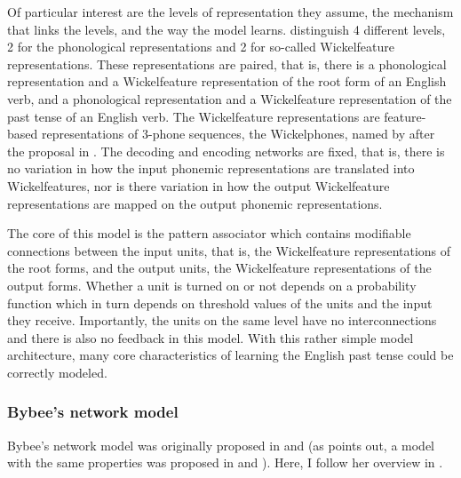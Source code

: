 Of particular interest are the levels of representation they assume,
the mechanism that links the levels, and the way the model learns. 
\citet{RumelhartandMcClelland:1986} distinguish
 4 different levels, 2 for the
phonological representations and 2 for so-called Wickelfeature
representations. These representations are paired, that is, there is a
phonological representation and a Wickelfeature representation of the
root form of an English
verb, and a phonological representation and a Wickelfeature
representation of the past tense of an English verb.
The Wickelfeature representations are  feature-based
representations of 3-phone
sequences, the Wickelphones, named by \citet{RumelhartandMcClelland:1986} after the proposal in 
\citet{Wickelgren:1969}.
The decoding and encoding networks are fixed, that is, there is no
variation in how the input phonemic representations are translated
into Wickelfeatures, nor is there variation in how the output Wickelfeature representations
are mapped on the output phonemic representations.

The core
of this model is the pattern associator which contains modifiable
connections between the input units,
that is, the Wickelfeature representations of the root forms, and the
output units, the Wickelfeature representations of the output
forms. Whether a unit is turned on or not depends on a probability
function which in turn depends on threshold values of the units and
the input they receive. Importantly, the units on the same level have
no interconnections and there is also no feedback in this
model. With this rather simple model architecture, many core
characteristics of learning the English past tense could be correctly modeled.


\subsubsection{Bybee's network model}
\label{sec:bybee}

Bybee's network model was originally proposed in \citet{Bybee:1985}
and \citet{Bybee:1988} (as \citealt[428]{Bybee:1995} points out, a model
with the same properties was proposed in \citealt{Langacker:1987} and \citealt{Langacker:1988}). Here, I follow her overview in
\citet[428--431]{Bybee:1995}. 

